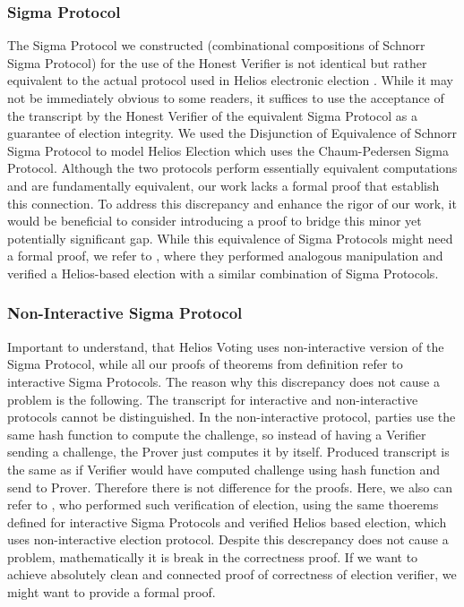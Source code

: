 \subsubsection{Sigma Protocol}
The Sigma Protocol we constructed (combinational compositions of Schnorr Sigma Protocol) for the use of the Honest Verifier is not identical but rather equivalent to the actual protocol used in Helios electronic election . While it may not be immediately obvious to some readers, it suffices to use the acceptance of the transcript by the Honest Verifier of the equivalent Sigma Protocol as a guarantee of election integrity. We used the Disjunction of Equivalence of Schnorr Sigma Protocol to model Helios Election which uses the Chaum-Pedersen Sigma Protocol.  Although the two protocols perform essentially equivalent computations and are fundamentally equivalent, our work lacks a formal proof that establish this connection. To address this discrepancy and enhance the rigor of our work, it would be beneficial to consider introducing a proof to bridge this minor yet potentially significant gap.
 While this equivalence of Sigma Protocols might need a formal proof, we refer to \cite{Haines2019VerifiedVF}, where they performed analogous manipulation and verified a Helios-based election with a similar combination of Sigma Protocols.

\subsubsection{Non-Interactive Sigma Protocol}
Important to understand, that Helios Voting uses non-interactive version of the Sigma Protocol, while all our proofs of theorems from definition refer to interactive Sigma Protocols. The reason why this discrepancy does not cause a problem is the following. The transcript for interactive and non-interactive protocols cannot be distinguished. In the non-interactive protocol, parties use the same hash function to compute the challenge, so instead of having a Verifier sending a challenge, the Prover just computes it by itself. Produced transcript is the same as if Verifier would have computed challenge using hash function and send to Prover. Therefore there is not difference for the proofs. Here, we also can refer to \cite{Haines2019VerifiedVF}, who performed such verification of election, using the same thoerems defined for interactive Sigma Protocols and verified Helios based election, which uses non-interactive election protocol. Despite this descrepancy does not cause a problem, mathematically it is break in the correctness proof. If we want to achieve absolutely clean and connected proof of correctness of election verifier, we might want to provide a formal proof.

